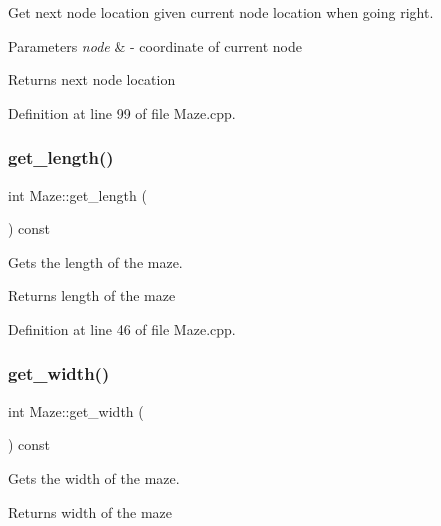 Get next node location given current node location when going right. 


\begin{DoxyParams}{Parameters}
{\em node} & -\/ coordinate of current node \\
\hline
\end{DoxyParams}
\begin{DoxyReturn}{Returns}
next node location 
\end{DoxyReturn}


Definition at line 99 of file Maze.\+cpp.

\mbox{\label{class_maze_a763b16546d7ab2f18919ad1506a8dc5a}} 
\subsubsection{\texorpdfstring{get\_length()}{get\_length()}}
{\footnotesize\ttfamily int Maze\+::get\+\_\+length (\begin{DoxyParamCaption}{ }\end{DoxyParamCaption}) const}



Gets the length of the maze. 

\begin{DoxyReturn}{Returns}
length of the maze 
\end{DoxyReturn}


Definition at line 46 of file Maze.\+cpp.

\mbox{\label{class_maze_a5210be39a897f9e9058b27ea09852a86}} 
\subsubsection{\texorpdfstring{get\_width()}{get\_width()}}
{\footnotesize\ttfamily int Maze\+::get\+\_\+width (\begin{DoxyParamCaption}{ }\end{DoxyParamCaption}) const}



Gets the width of the maze. 

\begin{DoxyReturn}{Returns}
width of the maze 
\end{DoxyReturn}


